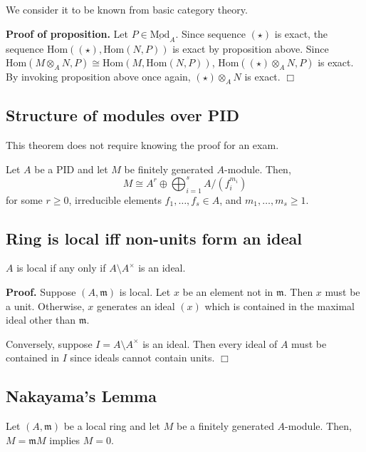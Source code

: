 \documentclass{template}
\newcommand{\qedwhite}{\hfill \ensuremath{\Box}}
\begin{document}
We consider it to be known from basic category theory. 

\textbf{Proof of proposition.} Let $P \in \underline{\text{Mod}}_A$. Since
sequence $(\star)$ is exact, the sequence $\text{Hom}((\star), \text{Hom}(N,
P))$ is exact by proposition above. Since $\text{Hom}(M \otimes_A N, P) \cong
\text{Hom}(M, \text{Hom}(N,P))$, $\text{Hom}((\star) \otimes_A N, P)$ is exact.
By invoking proposition above once again, $(\star) \otimes_A N$ is exact.
\qedwhite

\subsection{Structure of modules over PID}

This theorem does not require knowing the proof for an exam.

\begin{theorem}
    Let $A$ be a PID and let $M$ be finitely generated $A$-module. Then,
    \begin{equation*}
        M \cong A^r \oplus \bigoplus_{i=1}^s A/(f_i^{m_i})
    \end{equation*}
    for some $r \geq 0$, irreducible elements $f_1,\dots,f_s \in A$, and
    $m_1,\dots,m_s \geq 1$.
\end{theorem}

\subsection{Ring is local iff non-units form an ideal}

\begin{lemma}
    $A$ is local if any only if $A\setminus A^{\times}$ is an ideal.
\end{lemma}

\textbf{Proof.} Suppose $(A,\mathfrak{m})$ is local. Let $x$ be an element not
in $\mathfrak{m}$. Then $x$ must be a unit. Otherwise, $x$ generates an ideal
$(x)$ which is contained in the maximal ideal other than $\mathfrak{m}$.

Conversely, suppose $I = A\setminus A^{\times}$ is an ideal. Then every ideal of
$A$ must be contained in $I$ since ideals cannot contain units. \qedwhite

\subsection{Nakayama's Lemma}

\begin{lemma}
    Let $(A,\mathfrak{m})$ be a local ring and let $M$ be a finitely 
    generated $A$-module. Then, $M=\mathfrak{m}M$ implies $M=0$.
\end{lemma}
\end{document}

